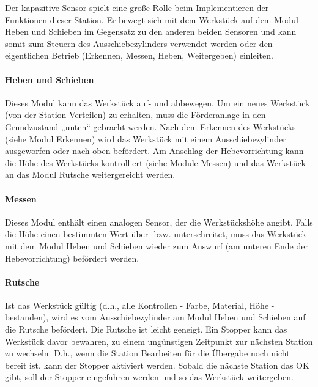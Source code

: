 \documentclass[11pt,a4paper,ngerman]{article}
\begin{document}
Der kapazitive Sensor spielt eine große Rolle beim Implementieren der Funktionen dieser Station. Er bewegt sich mit dem Werkstück auf dem Modul Heben und Schieben im Gegensatz zu den anderen beiden Sensoren und kann somit zum Steuern des Ausschiebezylinders verwendet werden oder den eigentlichen Betrieb (Erkennen, Messen, Heben, Weitergeben) einleiten.

\paragraph{Heben und Schieben}
Dieses Modul kann das Werkstück auf- und abbewegen. Um ein neues Werkstück (von der Station Verteilen) zu erhalten, muss die Förderanlage in den Grundzustand „unten“ gebracht werden. Nach dem Erkennen des Werkstücks (siehe Modul Erkennen) wird das Werkstück mit einem Ausschiebezylinder ausgeworfen oder nach oben befördert. Am Anschlag der Hebevorrichtung kann die Höhe des Werkstücks kontrolliert (siehe Module Messen) und das Werkstück an das Modul Rutsche weitergereicht werden.

\paragraph{Messen}
Dieses Modul enthält einen analogen Sensor, der die Werkstückshöhe angibt. Falls die Höhe einen bestimmten Wert über- bzw. unterschreitet, muss das Werkstück mit dem Modul Heben und Schieben wieder zum Auswurf (am unteren Ende der Hebevorrichtung) befördert werden.

\paragraph{Rutsche}
Ist das Werkstück gültig (d.h., alle Kontrollen - Farbe, Material, Höhe - bestanden), wird es vom Ausschiebezylinder am Modul Heben und Schieben auf die Rutsche befördert. Die Rutsche ist leicht geneigt. Ein Stopper kann das Werkstück davor bewahren, zu einem ungünstigen Zeitpunkt zur nächsten Station zu wechseln. D.h., wenn die Station Bearbeiten für die Übergabe noch nicht bereit ist, kann der Stopper aktiviert werden. Sobald die nächste Station das OK gibt, soll der Stopper eingefahren werden und so das Werkstück weitergeben.
\end{document}
